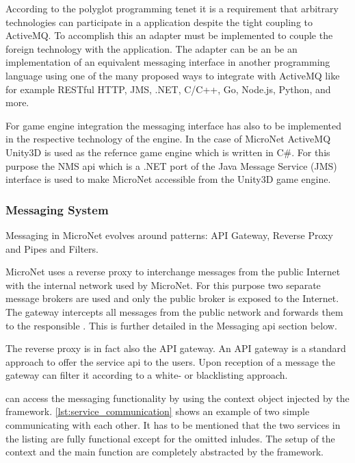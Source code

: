 According to the polyglot programming tenet it is a requirement that arbitrary
technologies can participate in a \ms{} application despite the tight coupling
to ActiveMQ. To accomplish this an adapter must be implemented to couple the
foreign technology with the application. The adapter can be an be an
implementation of an equivalent messaging interface in another programming
language using one of the many proposed ways to integrate with ActiveMQ like for
example RESTful HTTP, JMS, .NET, C/C++, Go, Node.js, Python, and more.

For game engine integration the messaging interface has also to be implemented
in the respective technology of the engine. In the case of MicroNet ActiveMQ
Unity3D is used as the refernce game engine which is written in C\#. For this
purpose the NMS \gls{api} which is a .NET port of the Java Message Service (JMS)
interface is used to make MicroNet accessible from the Unity3D game engine.

\subsubsection{Messaging System}

Messaging in MicroNet evolves around patterns: API Gateway, Reverse Proxy and
Pipes and Filters.

MicroNet uses a reverse proxy to interchange messages from the public Internet
with the internal network used by MicroNet. For this purpose two separate
message brokers are used and only the public broker is exposed to the Internet.
The gateway intercepts all messages from the public network and forwards them to
the responsible \ms{}. This is further detailed in the Messaging \gls{api} section
below.

The reverse proxy is in fact also the API gateway. An API gateway is a standard
approach to offer the service \gls{api} to the users. Upon reception of a message the
gateway can filter it according to a white- or blacklisting approach.

\mss{} can access the messaging functionality by using the context object
injected by the framework. \autoref{lst:service_communication} shows an example
of two simple \mss{} communicating with each other. It has to be mentioned that
the two services in the listing are fully functional except for the omitted
inludes. The setup of the context and the \ms{} main function are completely
abstracted by the framework.

